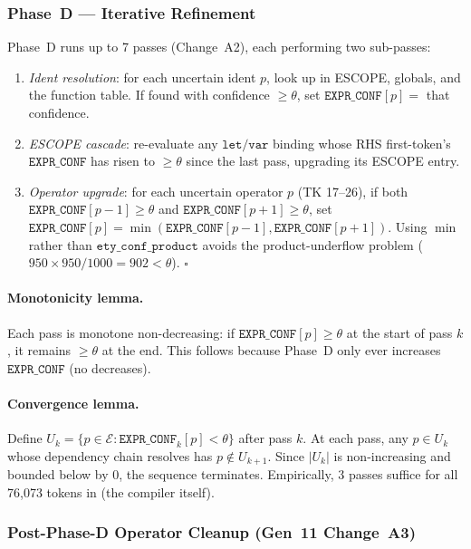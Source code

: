 \subsubsection*{Phase~D — Iterative Refinement}

Phase~D runs up to 7 passes (Change~A2), each performing two sub-passes:
\begin{enumerate}
\item \emph{Ident resolution}: for each uncertain ident $p$,
  look up in ESCOPE, globals, and the function table.
  If found with confidence $\geq \theta$, set $\mathtt{EXPR\_CONF}[p] = $ that confidence.
\item \emph{ESCOPE cascade}: re-evaluate any $\mathtt{let/var}$ binding whose
  RHS first-token's $\mathtt{EXPR\_CONF}$ has risen to $\geq \theta$ since the last pass,
  upgrading its ESCOPE entry.
\item \emph{Operator upgrade}: for each uncertain operator $p$ (TK 17--26),
  if both $\mathtt{EXPR\_CONF}[p-1] \geq \theta$ and $\mathtt{EXPR\_CONF}[p+1] \geq \theta$,
  set $\mathtt{EXPR\_CONF}[p] = \min(\mathtt{EXPR\_CONF}[p-1], \mathtt{EXPR\_CONF}[p+1])$.
  Using $\min$ rather than $\mathtt{ety\_conf\_product}$ avoids the product-underflow
  problem ($950 \times 950 / 1000 = 902 < \theta$). $\square$
\end{enumerate}

\paragraph{Monotonicity lemma.}
Each pass is monotone non-decreasing: if $\mathtt{EXPR\_CONF}[p] \geq \theta$
at the start of pass $k$, it remains $\geq \theta$ at the end.
This follows because Phase~D only ever increases $\mathtt{EXPR\_CONF}$ (no decreases).

\paragraph{Convergence lemma.}
Define $U_k = \{p \in \mathcal{E} : \mathtt{EXPR\_CONF}_k[p] < \theta\}$ after pass $k$.
At each pass, any $p \in U_k$ whose dependency chain resolves has $p \notin U_{k+1}$.
Since $|U_k|$ is non-increasing and bounded below by $0$, the sequence terminates.
Empirically, 3 passes suffice for all 76,073 tokens in \lean{} (the compiler itself).

\subsubsection*{Post-Phase-D Operator Cleanup (Gen~11 Change~A3)}

